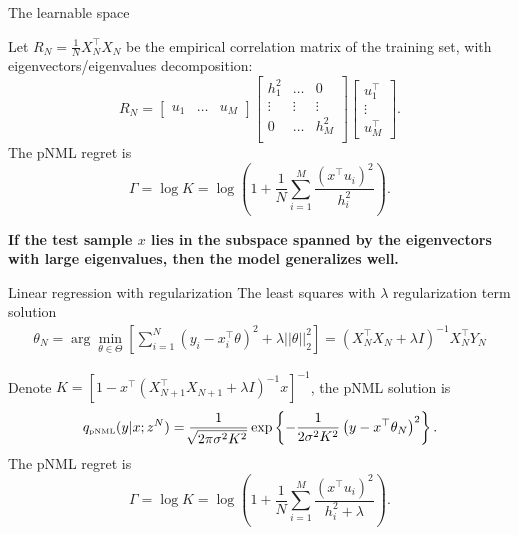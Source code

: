 \documentclass[aspectratio=169]{beamer}
\begin{document}
\begin{frame}{The learnable space}
\begin{theorem}
    Let $R_N=\frac{1}{N} X_N^\top X_N  $ be the empirical correlation matrix of the training set, with eigenvectors/eigenvalues decomposition: 
    \begin{equation*}
    R_N = \begin{bmatrix} u_1 & \hdots & u_M \end{bmatrix}
    \begin{bmatrix}
    h_1^2 & \hdots & 0 \\
    \vdots & \vdots &  \vdots \\
    0 & \hdots &  h_M^2 \\
    \end{bmatrix}
    \begin{bmatrix}
    u_1^\top \\ \vdots \\ u_M^\top 
    \end{bmatrix}.
    \end{equation*}
    \newline
    The pNML regret is
    \begin{equation}
    \Gamma = \log K = \log \left(1 + \frac{1}{N} \sum_{i=1}^{M} \frac{\left(x^\top u_i\right)^2 }{h_i^2}\right).
    \end{equation}
\end{theorem} 
\pause
{\bf If the test sample $x$ lies in the subspace spanned by the eigenvectors with large eigenvalues, then the model generalizes well.}
\end{frame}



\begin{frame}{Linear regression with regularization}
The least squares with $\lambda$ regularization term  solution 
    \begin{align}
    \theta_N = \arg\min_{\theta\in\Theta} \left[ \sum_{i=1}^N \left(y_i - x_i^\top \theta \right)^2 + \lambda ||\theta||_2^2 \right] = (X_N^\top X_N + \lambda I)^{-1} X_N^\top Y_N
    \end{align}
\pause
\begin{theorem}
Denote  $K = \left[1 - x^\top (X_{N+1}^\top X_{N+1} + \lambda I)^{-1} x \right]^{-1}$, the pNML solution is
\begin{equation}
    q_{\mbox{\tiny{pNML}}}(y | x; z^N) = \frac{1}{\sqrt[]{2\pi\sigma^2 K^2}}\exp\left\{-\frac{1}{2\sigma^2 K^2}\left(y-x^\top \theta_N \right)^2\right\}.
\end{equation}
The pNML regret is
\begin{equation}
    \Gamma = \log K = \log \left(1 + \frac{1}{N} \sum_{i=1}^{M} \frac{\left(x^\top u_i\right)^2 }{h_i^2 + \lambda}\right).
\end{equation}
\end{theorem}
\end{frame}
\end{document}
